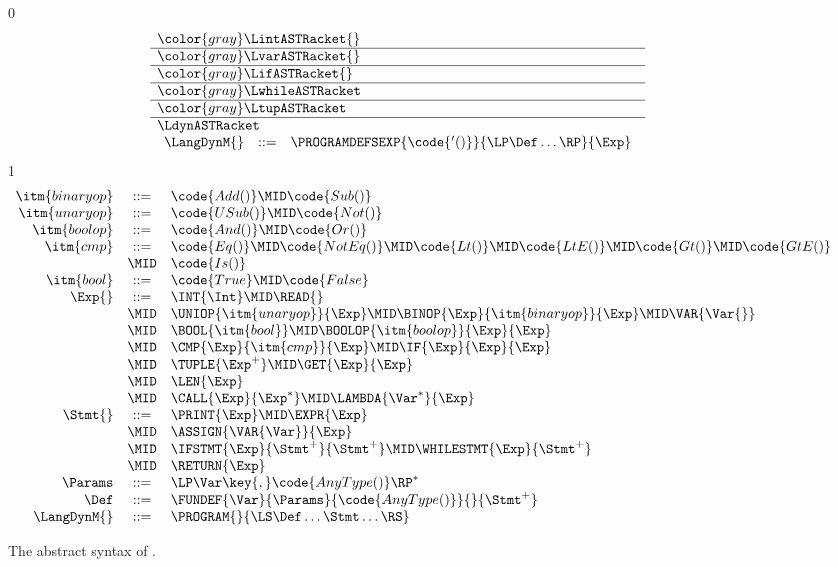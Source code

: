 \documentclass[7x10]{TimesAPriori_MIT}%
\newcommand{\gray}[1]{{\color{gray} #1}}
\def\racketEd{0}
\def\pythonEd{1}
\def\edition{1}
\newcommand{\pythonColor}[0]{}
\numberwithin{theorem}{chapter}
\numberwithin{definition}{chapter}
\numberwithin{equation}{chapter}
\begin{document}
\begin{figure}[tp]
\centering
\begin{tcolorbox}[colback=white]
    \small
{\if\edition\racketEd
\[
\begin{array}{l}
  \gray{\LintASTRacket{}} \\ \hline
  \gray{\LvarASTRacket{}} \\ \hline
  \gray{\LifASTRacket{}} \\ \hline
  \gray{\LwhileASTRacket} \\ \hline
  \gray{\LtupASTRacket} \\  \hline
\LdynASTRacket \\
\begin{array}{lcl}
  \LangDynM{} &::=& \PROGRAMDEFSEXP{\code{'()}}{\LP\Def\ldots\RP}{\Exp} 
\end{array}
\end{array}
\]
\fi}
{\if\edition\pythonEd\pythonColor
\[
\begin{array}{rcl}
\itm{binaryop} &::= & \code{Add()} \MID \code{Sub()} \\
\itm{unaryop} &::= & \code{USub()} \MID \code{Not()} \\
\itm{boolop} &::=& \code{And()} \MID \code{Or()} \\
\itm{cmp} &::= & \code{Eq()} \MID \code{NotEq()} \MID \code{Lt()}
   \MID \code{LtE()} \MID \code{Gt()} \MID \code{GtE()} \\
   &\MID & \code{Is()} \\
\itm{bool} &::=& \code{True} \MID \code{False} \\
\Exp{} &::=& \INT{\Int} \MID \READ{} \\
  &\MID& \UNIOP{\itm{unaryop}}{\Exp}
    \MID  \BINOP{\Exp}{\itm{binaryop}}{\Exp}  
    \MID \VAR{\Var{}} \\
  &\MID& \BOOL{\itm{bool}} 
     \MID \BOOLOP{\itm{boolop}}{\Exp}{\Exp}\\
  &\MID& \CMP{\Exp}{\itm{cmp}}{\Exp}  \MID \IF{\Exp}{\Exp}{\Exp} \\
  &\MID& \TUPLE{\Exp^{+}} \MID \GET{\Exp}{\Exp} \\
  &\MID& \LEN{\Exp} \\
  &\MID& \CALL{\Exp}{\Exp^{*}} \MID \LAMBDA{\Var^{*}}{\Exp} \\
\Stmt{} &::=& \PRINT{\Exp} \MID \EXPR{\Exp} \\
  &\MID& \ASSIGN{\VAR{\Var}}{\Exp}\\
  &\MID& \IFSTMT{\Exp}{\Stmt^{+}}{\Stmt^{+}} 
  \MID \WHILESTMT{\Exp}{\Stmt^{+}}\\
  &\MID& \RETURN{\Exp} \\
\Params &::=& \LP\Var\key{,}\code{AnyType()}\RP^*   \\
\Def &::=& \FUNDEF{\Var}{\Params}{\code{AnyType()}}{}{\Stmt^{+}}  \\
\LangDynM{} &::=& \PROGRAM{}{\LS \Def \ldots \Stmt \ldots \RS}
\end{array}
\]
\fi}
\end{tcolorbox}

\caption{The abstract syntax of \LangDyn{}.}
\label{fig:r7-syntax}
\end{figure}
\end{document}
